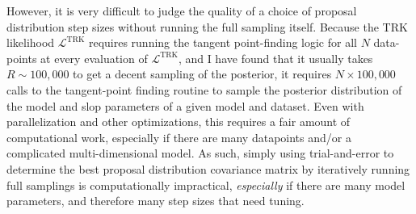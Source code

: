 However, it is very difficult to judge the quality of a choice of proposal distribution step sizes without running the full sampling itself. Because the TRK likelihood $\mathcal{L}^\text{TRK}$ requires running the tangent point-finding logic for all $N$ data-points at every evaluation of $\mathcal{L}^\text{TRK}$, and I have found that it usually takes $R\sim 100,000$ to get a decent sampling of the posterior, it requires $N\times 100,000$ calls to the tangent-point finding routine to sample the posterior distribution of the model and slop parameters of a given model and dataset. Even with parallelization and other optimizations, this requires a fair amount of computational work, especially if there are many datapoints and/or a complicated multi-dimensional model. As such, simply using trial-and-error to determine the best proposal distribution covariance matrix by iteratively running full samplings is computationally impractical, \textit{especially} if there are many model parameters, and therefore many step sizes that need tuning.

